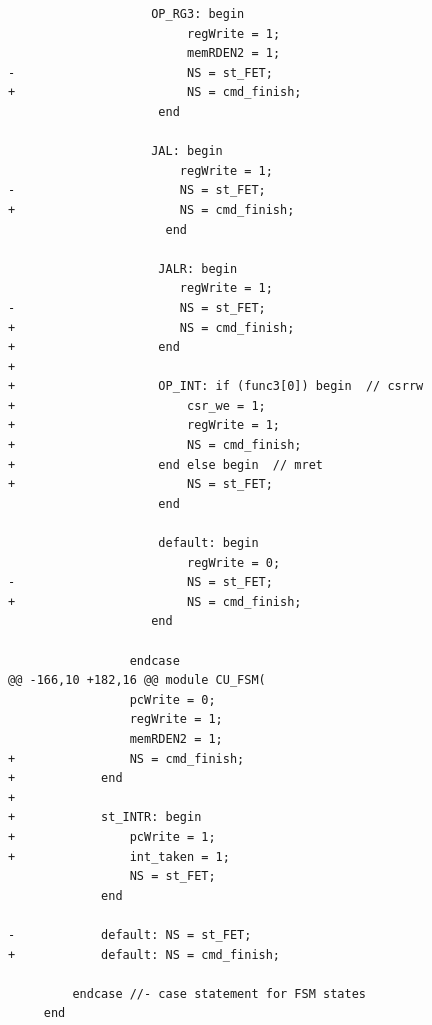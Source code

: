 \documentclass{article}
\begin{document}
\begin{verbatim}
 					OP_RG3: begin 
                         regWrite = 1;	
                         memRDEN2 = 1;
-                        NS = st_FET;
+                        NS = cmd_finish;
                     end
 					
 	                JAL: begin
 					    regWrite = 1; 
-					    NS = st_FET;
+					    NS = cmd_finish;
                      end
                     
                     JALR: begin
 					    regWrite = 1; 
-					    NS = st_FET;
+					    NS = cmd_finish;
+                    end
+                    
+                    OP_INT: if (func3[0]) begin  // csrrw
+                        csr_we = 1;
+                        regWrite = 1;
+                        NS = cmd_finish;
+                    end else begin  // mret
+                        NS = st_FET;
                     end
 					 
                     default: begin 
                         regWrite = 0;
-                        NS = st_FET;
+                        NS = cmd_finish;
 					end
 					
                 endcase
@@ -166,10 +182,16 @@ module CU_FSM(
                 pcWrite = 0;
                 regWrite = 1; 
                 memRDEN2 = 1;
+                NS = cmd_finish;
+            end
+            
+            st_INTR: begin
+                pcWrite = 1;
+                int_taken = 1;
                 NS = st_FET;
             end
  
-            default: NS = st_FET;
+            default: NS = cmd_finish;
            
         endcase //- case statement for FSM states
     end
\end{verbatim}

\pagebreak
\end{document}
